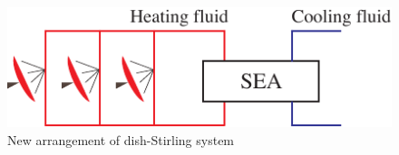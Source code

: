 
\noindent \begin{figure}[htbp]
\begin{center}
	\includegraphics[width = 0.7\columnwidth]{./fig/Dish_SEA}
	\caption{New arrangement of dish-Stirling system}
	\label{fig:Dish_SEA}
\end{center}
\end{figure}

